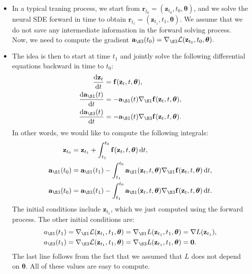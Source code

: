 \documentclass[10pt]{article}
\newcommand{\dee}{\mathrm{d}}
\newcommand{\ve}[1]{\mathbf{#1}}
\newcommand{\ves}[1]{\boldsymbol{#1}}
\newcommand{\mcal}[1]{\mathcal{#1}}
\begin{document}
\begin{itemize}
\begin{proof}
\begin{align*}
\begin{bmatrix}
        & \nabla_{\S3}\ve{f}(\ve{z}_t, t, \ves{\theta}) \\
        \ve{0} & 0 & \ve{0} \\
        \ve{0} & \ve{0} & \ve{0}
      \end{bmatrix}
    \end{align*}
    as required.
  \end{proof}
  \item In a typical traning process, we start from $\ve{r}_{t_0} = (\ve{z}_{t_0}, t_0, \ves{\theta})$, and we solve the neural SDE forward in time to obtain $\ve{r}_{t_1} = (\ve{z}_{t_1}, t_1, \ves{\theta})$. We assume that we do not save any intermediate information in the forward solving process. Now, we need to compute the gradient $\ve{a}_{\S3}(t_0) = \nabla_{\S3}\mcal{L}(\ve{z}_{t_0}, t_0, \ves{\theta}).$
    
  \item The idea is then to start at time $t_1$ and jointly solve the following differential equations backward in time to $t_0$:
  \begin{align*}
    \frac{\dee \ve{z}_t}{\dee t} &= \ve{f}(\ve{z}_t, t, \ves{\theta}), \\
    \frac{\dee \ve{a}_{\S1}(t)}{\dee t} &= -\ve{a}_{\S 1}(t) \nabla_{\S 1}\ve{f}(\ve{z}_t, t, \ves{\theta}), \\
    \frac{\dee \ve{a}_{\S3}(t)}{\dee t} &= -\ve{a}_{\S 1}(t) \nabla_{\S 3}\ve{f}(\ve{z}_t, t, \ves{\theta}).
  \end{align*}
  In other words, we would like to compute the following integrals:
  \begin{align*}
    \ve{z}_{t_0} &= \ve{z}_{t_1} + \int_{t_1}^{t_0} \ve{f}(\ve{z}_t, t, \ves{\theta})\, \dee t, \\
    \ve{a}_{\S1}(t_0) &= \ve{a}_{\S1}(t_1) - \int_{t_1}^{t_0} \ve{a}_{\S 1}(\ve{z}_t, t, \ves{\theta}) \nabla_{\S 1}\ve{f}(\ve{z}_t, t, \ves{\theta})\, \dee t, \\
    \ve{a}_{\S3}(t_0) &= \ve{a}_{\S3}(t_1) - \int_{t_1}^{t_0} \ve{a}_{\S 1}(\ve{z}_t, t, \ves{\theta}) \nabla_{\S 3}\ve{f}(\ve{z}_t, t, \ves{\theta})\, \dee t.
  \end{align*}
  The initial conditions include $\ve{z}_{t_1}$, which we just computed using the forward process. The other initial conditions are:
  \begin{align*}
    a_{\S1}(t_1) 
    &= \nabla_{\S1}\mcal{L}(\ve{z}_{t_1},t_1,\ves{\theta}) = \nabla_{\S1}L(\ve{z}_{t_1},t_1,\ves{\theta}) = \nabla L(\ve{z}_{t_1}), \\
    a_{\S3}(t_1) 
    &= \nabla_{\S3}\mcal{L}(\ve{z}_{t_1},t_1,\ves{\theta})
    = \nabla_{\S3}L(\ve{z}_{t_1},t_1,\ves{\theta}) 
    = \ve{0}.
  \end{align*} 
  The last line follows from the fact that we assumed that $L$ does not depend on $\ves{\theta}$. All of these values are easy to compute.


\end{itemize}
\end{document}

